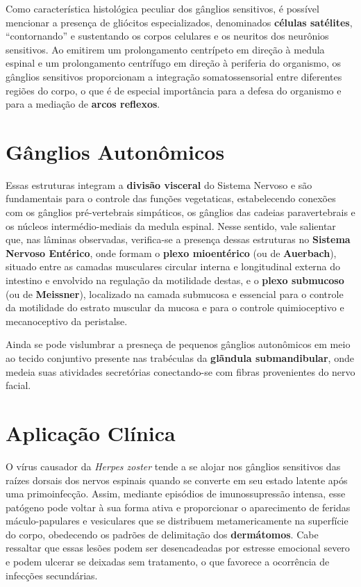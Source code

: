 \documentclass[
]{book}
\begin{document}
Como característica histológica peculiar dos gânglios sensitivos, é possível mencionar a presença de gliócitos especializados, denominados \textbf{células satélites}, ``contornando'' e sustentando os corpos celulares e os neuritos dos neurônios sensitivos. Ao emitirem um prolongamento centrípeto em direção à medula espinal e um prolongamento centrífugo em direção à periferia do organismo, os gânglios sensitivos proporcionam a integração somatossensorial entre diferentes regiões do corpo, o que é de especial importância para a defesa do organismo e para a mediação de \textbf{arcos reflexos}.

\hypertarget{guxe2nglios-autonuxf4micos}{%
\section{Gânglios Autonômicos}\label{guxe2nglios-autonuxf4micos}}

Essas estruturas integram a \textbf{divisão visceral} do Sistema Nervoso e são fundamentais para o controle das funções vegetaticas, estabelecendo conexões com os gânglios pré-vertebrais simpáticos, os gânglios das cadeias paravertebrais e os núcleos intermédio-mediais da medula espinal. Nesse sentido, vale salientar que, nas lâminas observadas, verifica-se a presença dessas estruturas no \textbf{Sistema Nervoso Entérico}, onde formam o \textbf{plexo mioentérico} (ou de \textbf{Auerbach}), situado entre as camadas musculares circular interna e longitudinal externa do intestino e envolvido na regulação da motilidade destas, e o \textbf{plexo submucoso} (ou de \textbf{Meissner}), localizado na camada submucosa e essencial para o controle da motilidade do estrato muscular da mucosa e para o controle quimioceptivo e mecanoceptivo da peristalse.

Ainda se pode vislumbrar a presneça de pequenos gânglios autonômicos em meio ao tecido conjuntivo presente nas trabéculas da \textbf{glãndula submandibular}, onde medeia suas atividades secretórias conectando-se com fibras provenientes do nervo facial.

\hypertarget{aplicauxe7uxe3o-cluxednica}{%
\section{Aplicação Clínica}\label{aplicauxe7uxe3o-cluxednica}}

O vírus causador da \emph{Herpes zoster} tende a se alojar nos gânglios sensitivos das raízes dorsais dos nervos espinais quando se converte em seu estado latente após uma primoinfecção. Assim, mediante episódios de imunossupressão intensa, esse patógeno pode voltar à sua forma ativa e proporcionar o aparecimento de feridas máculo-papulares e vesiculares que se distribuem metamericamente na superfície do corpo, obedecendo os padrões de delimitação dos \textbf{dermátomos}. Cabe ressaltar que essas lesões podem ser desencadeadas por estresse emocional severo e podem ulcerar se deixadas sem tratamento, o que favorece a ocorrência de infecções secundárias.
\end{document}

